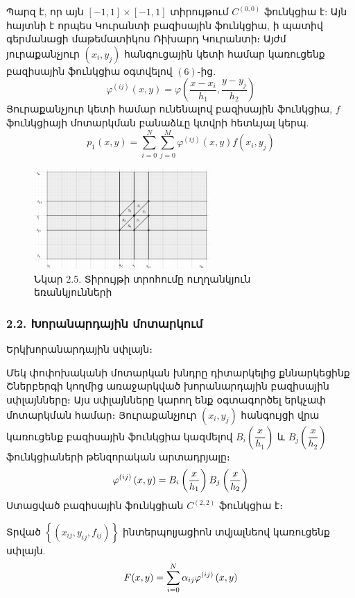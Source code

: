 \documentclass[fleqn, bachelor,subf,12pt,notitlepage]{article}
\begin{document}
Պարզ է, որ այն $\left[-1, 1\right] \times \left[-1	, 1\right]$ տիրույթում $C^{(0, 0)}$ ֆունկցիա է: Այն հայտնի է որպես Կուրանտի բազիսային ֆունկցիա, ի պատիվ գերմանացի մաթեմատիկոս Ռիխարդ Կուրանտի։
Այժմ յուրաքանչյուր $\left(x_{i}, y_{j}\right)$ հանգուցային կետի համար կառուցենք բազիսային ֆունկցիա օգտվելով $\left(6\right)$-ից.
\begin{equation}
\varphi^{(ij)}(x,y)=\varphi \left(\dfrac{x-x_{i}}{h_{1}}, \dfrac{y-y_{j}}{h_{2}}\right)
\end{equation}
Յուրաքանչյուր կետի համար ունենալով բազիսային ֆունկցիա, $f$ ֆունկցիայի մոտարկման բանաձևը կտվրի հետևյալ կերպ.
\begin{equation}
p_{1}(x,y)=\sum_{i=0}^{N}\sum_{j=0}^{M}\varphi^{(ij)}(x,y)f(x_{i}, y_{j})
\end{equation}
\begin{figure}[H]
\centering
\includegraphics[width=0.6\textwidth]{images/two_var_courant_3}
\captionsetup{labelformat=empty}
\caption{Նկար 2.5. Տիրույթի տրոհումը ուղղանկյուն եռանկյունների}
\end{figure}
\newpage
\subsubsection*{2.2. Խորանարդային մոտարկում}

Երկխորանարդային սփլայն։

Մեկ փոփոխականի մոտարկան խնդրը դիտարկելից քննարկեցինք Շներբերգի կողմից առաջարկված խորանարդային բազիսային սփլայնները։ Այս սփլայնները կարող ենք  օգտագործել երկչափ մոտարկման համար։
Յուրաքանչյուր $\left(x_{i}, y_{j}\right)$ հանգույցի վրա կառուցենք բազիսային ֆունկցիա կազմելով $B_{i}\left(\dfrac{x}{h_{1}}\right)$ և $B_{j}\left(\dfrac{x}{h_{2}}\right)$ ֆունկցիաների թենզորական  արտադրյալը։
\begin{equation}
\varphi^{(ij)}\left(x, y\right) = B_{i}\left(\dfrac{x}{h_{1}}\right) B_{j}\left(\dfrac{x}{h_{2}}\right)$$
\end{equation}
Ստացված բազիսային ֆունկցիան $C^{(2, 2)}$ ֆունկցիա է։

Տրված $\left\{\left(x_{ij}, y_{ij}, f_{ij}\right)\right\}$ ինտերպոլյացիոն տվյալնեով կառուցենք սփլայն.
\begin{equation}
F(x,y) = \sum_{i=0}^{N} \alpha_{ij}\varphi^{(ij)}\left(x, y\right)$$
\end{equation}
\end{document}
